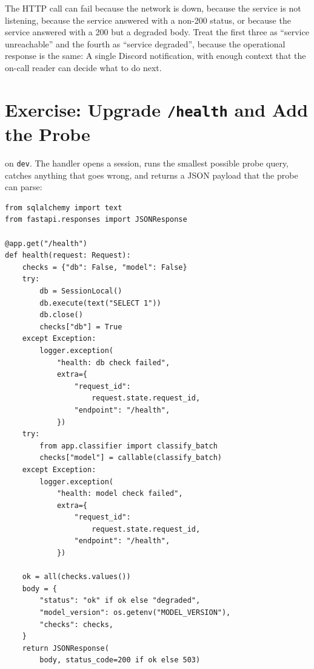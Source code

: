 The HTTP call can fail because the network is down, because the service
is not listening, because the service answered with a non-200 status,
or because the service answered with a 200 but a degraded body.
Treat the first three as ``service unreachable'' and the fourth as
``service degraded'', because the operational response is the same: A
single Discord notification, with enough context that the on-call
reader can decide what to do next.



\newpage
\section{Exercise: Upgrade \texttt{/health} and Add the Probe}

on \texttt{dev}. The handler opens a session, runs the smallest
possible probe query, catches anything that goes wrong, and returns a
JSON payload that the probe can parse:

\begin{verbatim}
from sqlalchemy import text
from fastapi.responses import JSONResponse

@app.get("/health")
def health(request: Request):
    checks = {"db": False, "model": False}
    try:
        db = SessionLocal()
        db.execute(text("SELECT 1"))
        db.close()
        checks["db"] = True
    except Exception:
        logger.exception(
            "health: db check failed",
            extra={
                "request_id":
                    request.state.request_id,
                "endpoint": "/health",
            })
    try:
        from app.classifier import classify_batch
        checks["model"] = callable(classify_batch)
    except Exception:
        logger.exception(
            "health: model check failed",
            extra={
                "request_id":
                    request.state.request_id,
                "endpoint": "/health",
            })

    ok = all(checks.values())
    body = {
        "status": "ok" if ok else "degraded",
        "model_version": os.getenv("MODEL_VERSION"),
        "checks": checks,
    }
    return JSONResponse(
        body, status_code=200 if ok else 503)
\end{verbatim}


